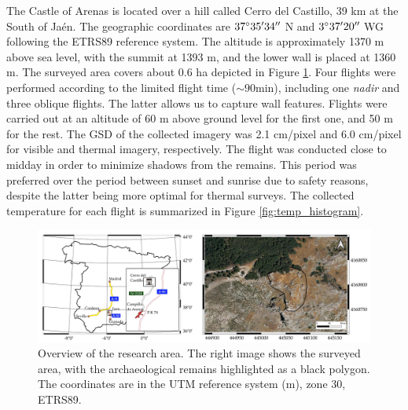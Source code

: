 The Castle of Arenas is located over a hill called Cerro del Castillo, 39 \si{\kilo\meter} at the South of Jaén. The geographic coordinates are $37^{\circ}35'34'' \hspace{1mm}$N and $3^{\circ}37'20'' \hspace{1mm}$WG following the ETRS89 reference system. The altitude is approximately 1370 \si{\meter} above sea level, with the summit at 1393 \si{\meter}, and the lower wall is placed at 1360 \si{\meter}. The surveyed area covers about 0.6 \si{\hectare} depicted in Figure \ref{fig:study_site}. Four flights were performed according to the limited flight time ($\sim90$\si{\minute}), including one \textit{nadir} and three oblique flights. The latter allows us to capture wall features. Flights were carried out at an altitude of 60 \si{\meter} above ground level for the first one, and 50 \si{\meter} for the rest. The GSD of the collected imagery was 2.1 \si{\centi\meter}/pixel and 6.0 \si{\centi\meter}/pixel for visible and thermal imagery, respectively. The flight was conducted close to midday in order to minimize shadows from the remains. This period was preferred over the period between sunset and sunrise due to safety reasons, despite the latter being more optimal for thermal surveys. The collected temperature for each flight is summarized in Figure \ref{fig:temp_histogram}. 

\begin{figure}[htbp]
  \centering
  \includegraphics[width=\linewidth]{figs/castle_puerta_arenas/study_area.png}
  \caption{Overview of the research area. The right image shows the surveyed area, with the archaeological remains highlighted as a black polygon. The coordinates are in the UTM reference system (\si{\meter}), zone 30, ETRS89.}
  \label{fig:study_site}
\end{figure}

